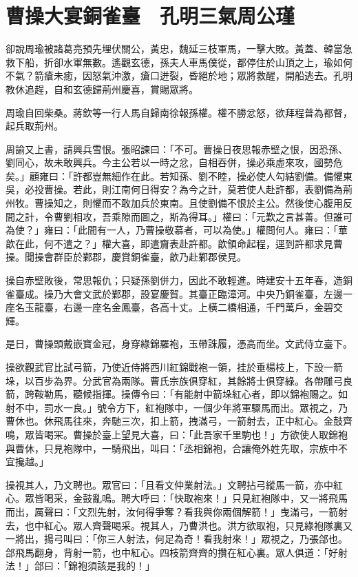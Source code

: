 
\chapter{曹操大宴銅雀臺　孔明三氣周公瑾}

卻說周瑜被諸葛亮預先埋伏關公，黃忠，魏延三枝軍馬，一擊大敗。黃蓋、韓當急救下船，折卻水軍無數。遙觀玄德，孫夫人車馬僕從，都停住於山頂之上，瑜如何不氣？箭瘡未癒，因怒氣沖激，瘡口迸裂，昏絕於地；眾將救醒，開船逃去。孔明教休追趕，自和玄德歸荊州慶喜，賞賜眾將。

周瑜自回柴桑。蔣欽等一行人馬自歸南徐報孫權。權不勝忿怒，欲拜程普為都督，起兵取荊州。

周諭又上書，請興兵雪恨。張昭諫曰：「不可。曹操日夜思報赤壁之恨，因恐孫、劉同心，故未敢興兵。今主公若以一時之忿，自相吞併，操必乘虛來攻，國勢危矣。」顧雍曰：「許都豈無細作在此。若知孫、劉不睦，操必使人勾結劉備。備懼東吳，必投曹操。若此，則江南何日得安？為今之計，莫若使人赴許都，表劉備為荊州牧。曹操知之，則懼而不敢加兵於東南。且使劉備不恨於主公。然後使心腹用反間之計，令曹劉相攻，吾乘隙而圖之，斯為得耳。」權曰：「元歎之言甚善。但誰可為使？」雍曰：「此間有一人，乃曹操敬慕者，可以為使。」權問何人。雍曰：「華歆在此，何不遣之？」權大喜，即遣齎表赴許都。歆領命起程，逕到許都求見曹操。聞操會群臣於鄴郡，慶賞銅雀臺，歆乃赴鄴郡侯見。

操自赤壁敗後，常思報仇；只疑孫劉併力，因此不敢輕進。時建安十五年春，造銅雀臺成。操乃大會文武於鄴郡，設宴慶賀。其臺正臨漳河。中央乃銅雀臺，左邊一座名玉龍臺，右邊一座名金鳳臺，各高十丈。上橫二橋相通，千門萬戶，金碧交輝。

是日，曹操頭戴嵌寶金冠，身穿綠錦羅袍，玉帶誅履，憑高而坐。文武侍立臺下。

操欲觀武官比試弓箭，乃使近侍將西川紅錦戰袍一領，挂於垂楊枝上，下設一箭垛，以百步為界。分武官為兩隊。曹氏宗族俱穿紅，其餘將士俱穿綠。各帶雕弓良箭，跨鞍勒馬，聽候指揮。操傳令曰：「有能射中箭垛紅心者，即以錦袍賜之。如射不中，罰水一良。」號令方下，紅袍隊中，一個少年將軍驟馬而出。眾視之，乃曹休也。休飛馬往來，奔馳三次，扣上箭，拽滿弓，一箭射去，正中紅心。金鼓齊鳴，眾皆喝冞。曹操於臺上望見大喜，曰：「此吾家千里駒也！」方欲使人取錦袍與曹休，只見袍隊中，一騎飛出，叫曰：「丞相錦袍，合讓俺外姓先取，宗族中不宜攙越。」

操視其人，乃文聘也。眾官曰：「且看文仲業射法。」文聘拈弓縱馬一箭，亦中紅心。眾皆喝采，金鼓亂鳴。聘大呼曰：「快取袍來！」只見紅袍隊中，又一將飛馬而出，厲聲曰：「文烈先射，汝何得爭奪？看我與你兩個解箭！」曳滿弓，一箭射去，也中紅心。眾人齊聲喝采。視其人，乃曹洪也。洪方欲取袍，只見綠袍隊裏又一將出，揚弓叫曰：「你三人射法，何足為奇！看我射來！」眾視之，乃張郃也。郃飛馬翻身，背射一箭，也中紅心。四枝箭齊齊的攢在紅心裏。眾人俱道：「好射法！」郃曰：「錦袍須該是我的！」

